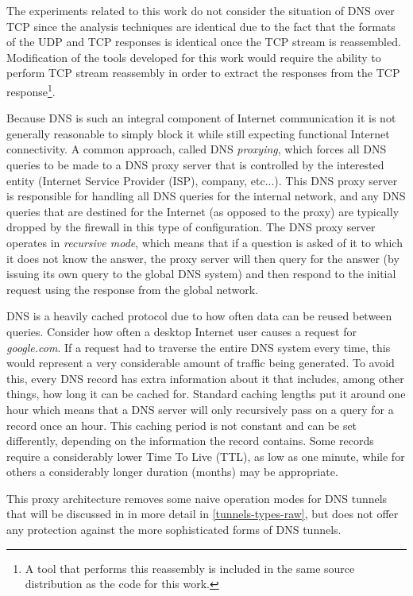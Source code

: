 \documentclass[12pt]{report}
\theoremstyle{remark}
\theoremstyle{definition}
\theoremstyle{definition}
\theoremstyle{definition}
\begin{document}
The experiments related to this work do not consider the situation of DNS over
TCP since the analysis techniques are identical due to the fact that the formats of the UDP and
TCP responses is identical once the TCP stream is reassembled. Modification of
the tools developed for this work would require the ability to perform TCP
stream reassembly in order to extract the responses from the TCP response\footnote{A tool that performs this reassembly is included in the same source distribution as the code for this work.}.

Because DNS is such an integral component of Internet communication it is not
generally reasonable to simply block it while still expecting functional
Internet connectivity. A common approach, called DNS \emph{proxying}, which
forces all DNS queries to be made to a DNS proxy server that is controlled by
the interested entity (Internet Service Provider (ISP), company, etc...). This DNS proxy server is
responsible for handling all DNS queries for the internal network, and any DNS
queries that are destined for the Internet (as opposed to the proxy) are
typically dropped by the firewall in this type of configuration. The DNS proxy
server operates in \emph{recursive mode}, which means that if a question is
asked of it to which it does not know the answer, the proxy server will then
query for the answer (by issuing its own query to the global DNS system) and
then respond to the initial request using the response from the global network.

DNS is a heavily cached protocol due to how often data can be reused between
queries. Consider how often a desktop Internet user causes a request for
\emph{google.com}. If a request had to traverse the entire DNS system every
time, this would represent a very considerable amount of traffic being
generated. To avoid this, every DNS record has extra information about it that
includes, among other things, how long it can be cached for. Standard caching
lengths put it around one hour which means that a DNS server will only
recursively pass on a query for a record once an hour. This caching period is
not constant and can be set differently, depending on the information the record
contains. Some records require a considerably lower Time To Live (TTL), as low
as one minute, while for others a considerably longer duration (months) may be
appropriate.

This proxy architecture removes some naive operation modes for DNS tunnels that
will be discussed in in more detail in \ref{tunnels-types-raw}, but does not
offer any protection against the more sophisticated forms of DNS tunnels.
\end{document}
